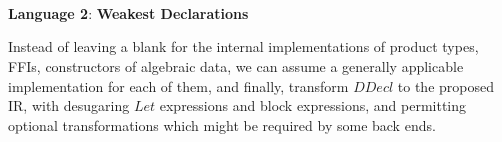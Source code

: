 \documentclass[a1,portrait]{a1poster}
\begin{document}
\begin{multicols}{2}
\begin{multicols}{2}
\begin{minipage}[t]{0.8\linewidth}
\begin{bnf*}
    \\
    \\
    \\
    \\
    \\
    \\
    \\
\end{bnf*}
\end{minipage}

\vfill\null
\columnbreak

\begin{minipage}[t]{0.8\linewidth}
\begin{bnf*}
    \\
    \\
    \\
    \\
    \\
    \\
\end{bnf*}
\end{minipage}
\end{multicols}

\vspace{-1cm}

\begin{center} {\textbf{Language 2}: \color{DarkRed} \textbf{Weakest Declarations}} \end{center}

Instead of leaving a blank for the internal implementations of product types, FFIs, constructors of algebraic data,
we can assume a generally applicable implementation for each of them, and finally,
transform $DDecl$ to the proposed IR, with desugaring $Let$ expressions and block expressions, and permitting
optional transformations which might be required by some back ends.


\end{multicols}
\end{document}
